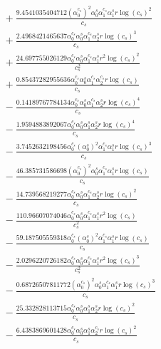 \documentclass[10pt]{article}
\begin{document}
\begin{align*}
&{}  + \frac{9.4541035404712 \left(\alpha_{0}^{c_s}\right)^{2} \alpha_{0}^s \alpha_{1}^{c_s} \alpha_{1}^s r \log{\left(c_{s} \right)}^{2}}{c_{s}} \\
&{}  + \frac{2.4968421465637 \alpha_{0}^{c_s} \alpha_{0}^s \alpha_{1}^{c_s} \alpha_{2}^s r \log{\left(c_{s} \right)}^{3}}{c_{s}} \\
&{}  + \frac{24.697755026129 \alpha_{0}^{c_s} \alpha_{0}^s \alpha_{1}^{c_s} \alpha_{1}^s r^{2} \log{\left(c_{s} \right)}^{2}}{c_{s}^{2}} \\
&{}  + \frac{0.85437282955636 \alpha_{0}^{c_s} \alpha_{0}^s \alpha_{1}^{c_s} \alpha_{2}^{c_s} r \log{\left(c_{s} \right)}}{c_{s}} \\
&{}  - \frac{0.14189767784134 \alpha_{0}^{c_s} \alpha_{0}^s \alpha_{1}^{c_s} \alpha_{2}^s r \log{\left(c_{s} \right)}^{4}}{c_{s}} \\
&{}  - \frac{1.9594883892067 \alpha_{0}^{c_s} \alpha_{0}^s \alpha_{1}^s \alpha_{2}^s r \log{\left(c_{s} \right)}^{4}}{c_{s}} \\
&{}  - \frac{3.7452632198456 \alpha_{0}^{c_s} \left(\alpha_{0}^s\right)^{2} \alpha_{1}^{c_s} \alpha_{1}^s r \log{\left(c_{s} \right)}^{3}}{c_{s}} \\
&{}  - \frac{46.385731586698 \left(\alpha_{0}^{c_s}\right)^{2} \alpha_{0}^s \alpha_{1}^{c_s} \alpha_{1}^s r \log{\left(c_{s} \right)}}{c_{s}} \\
&{}  - \frac{14.739568219277 \alpha_{0}^{c_s} \alpha_{0}^s \alpha_{1}^{c_s} \alpha_{2}^s r \log{\left(c_{s} \right)}^{2}}{c_{s}} \\
&{}  - \frac{110.96607074046 \alpha_{0}^{c_s} \alpha_{0}^s \alpha_{1}^{c_s} \alpha_{1}^s r^{2} \log{\left(c_{s} \right)}}{c_{s}^{2}} \\
&{}  - \frac{59.187505559318 \alpha_{0}^{c_s} \left(\alpha_{0}^s\right)^{2} \alpha_{1}^{c_s} \alpha_{1}^s r \log{\left(c_{s} \right)}}{c_{s}} \\
&{}  - \frac{2.0296220726182 \alpha_{0}^{c_s} \alpha_{0}^s \alpha_{1}^{c_s} \alpha_{1}^s r^{2} \log{\left(c_{s} \right)}^{3}}{c_{s}^{2}} \\
&{}  - \frac{0.68726507811772 \left(\alpha_{0}^{c_s}\right)^{2} \alpha_{0}^s \alpha_{1}^{c_s} \alpha_{1}^s r \log{\left(c_{s} \right)}^{3}}{c_{s}} \\
&{}  - \frac{25.332828113715 \alpha_{0}^{c_s} \alpha_{0}^s \alpha_{1}^s \alpha_{2}^s r \log{\left(c_{s} \right)}^{2}}{c_{s}} \\
&{}  - \frac{6.4383869601428 \alpha_{0}^{c_s} \alpha_{0}^s \alpha_{1}^s \alpha_{2}^{c_s} r \log{\left(c_{s} \right)}^{2}}{c_{s}}
\end{align*}
\end{document}
